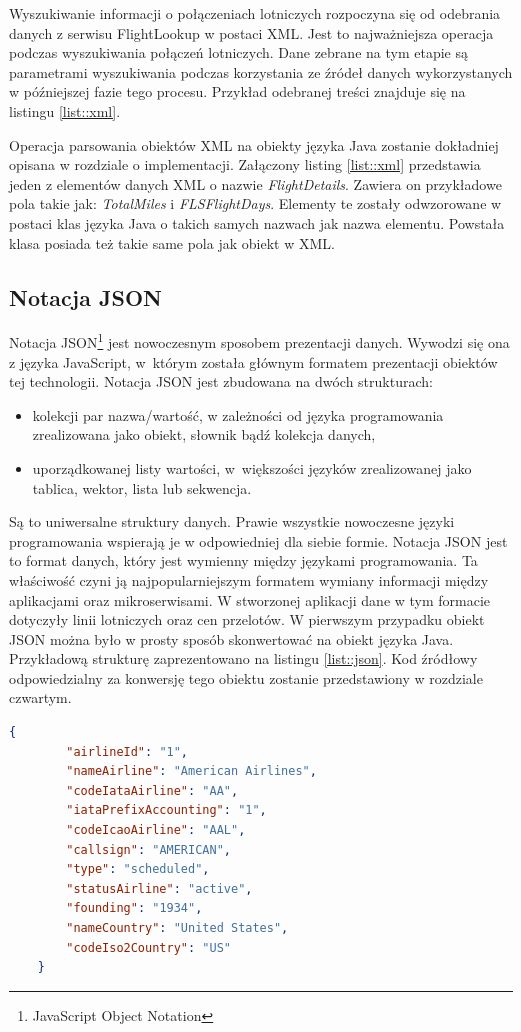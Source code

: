 \documentclass[12pt, twoside]{report}
\begin{document}
Wyszukiwanie informacji o połączeniach lotniczych rozpoczyna się od odebrania danych z serwisu FlightLookup w postaci XML. Jest to najważniejsza operacja podczas wyszukiwania połączeń lotniczych. Dane zebrane na tym etapie są parametrami wyszukiwania podczas korzystania ze źródeł danych wykorzystanych w późniejszej fazie tego procesu. Przykład odebranej treści znajduje się na listingu \ref{list::xml}.

Operacja parsowania obiektów XML na obiekty języka Java zostanie dokładniej opisana w rozdziale o implementacji. Załączony listing \ref{list::xml} przedstawia jeden z elementów danych XML o nazwie \textit{FlightDetails}. Zawiera on przykładowe pola takie jak: \textit{TotalMiles} i \textit{FLSFlightDays}. Elementy te zostały odwzorowane w postaci klas języka Java o takich samych nazwach jak nazwa elementu. Powstała klasa posiada też takie same pola jak obiekt w XML.

\subsection{Notacja JSON}
Notacja JSON\footnote{JavaScript Object Notation} jest nowoczesnym sposobem prezentacji danych. Wywodzi się ona z języka JavaScript, w~którym została głównym formatem prezentacji obiektów tej technologii. Notacja JSON jest zbudowana na dwóch strukturach:
\begin{itemize}[noitemsep,topsep=0pt]
\item kolekcji par nazwa/wartość, w zależności od języka programowania zrealizowana jako obiekt, słownik bądź kolekcja danych,
\item uporządkowanej listy wartości, w~większości języków zrealizowanej jako tablica, wektor, lista lub sekwencja.
\end{itemize}
Są to uniwersalne struktury danych. Prawie wszystkie nowoczesne języki programowania wspierają je w odpowiedniej dla siebie formie. Notacja JSON jest to format danych, który jest wymienny między językami programowania. Ta właściwość czyni ją najpopularniejszym formatem wymiany informacji między aplikacjami oraz mikroserwisami\cite{json}. W stworzonej aplikacji dane w tym formacie dotyczyły linii lotniczych oraz cen przelotów. W pierwszym przypadku obiekt JSON można było w prosty sposób skonwertować na obiekt języka Java. Przykładową strukturę zaprezentowano na listingu \ref{list::json}.
Kod źródłowy odpowiedzialny za konwersję tego obiektu zostanie przedstawiony w rozdziale czwartym.
\begin{lstlisting}[language=JSON, caption= Przykładowy obiekt w notacji JSON, label=list::json]
    {
        "airlineId": "1",
        "nameAirline": "American Airlines",
        "codeIataAirline": "AA",
        "iataPrefixAccounting": "1",
        "codeIcaoAirline": "AAL",
        "callsign": "AMERICAN",
        "type": "scheduled",
        "statusAirline": "active",
        "founding": "1934",
        "nameCountry": "United States",
        "codeIso2Country": "US"
    }
\end{lstlisting}
\end{document}
